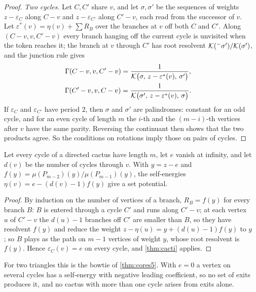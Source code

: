 \begin{proof}
\emph{Two cycles.} Let $C,C'$ share $v$, and let $\sigma,\sigma'$ be the sequences of weights $z-\varepsilon_C$ along $C-v$ and $z-\varepsilon_{C'}$ along $C'-v$, each read from the successor of $v$. Let $\varepsilon^{*}(v)=\eta(v)+\sum R_B$ over the branches at $v$ off both $C$ and $C'$. Along $(C-v,v,C'-v)$ every branch hanging off the current cycle is unvisited when the token reaches it; the branch at $v$ through $C'$ has root resolvent $\mathcal{K}({}^{-}\sigma')/\mathcal{K}(\sigma')$, and the junction rule gives
\begin{gather*}
\Gamma(C-v,v,C'-v)=\frac{1}{\mathcal{K}\bigl(\sigma,\,z-\varepsilon^{*}(v),\,\sigma'\bigr)},\\
\Gamma(C'-v,v,C-v)=\frac{1}{\mathcal{K}\bigl(\sigma',\,z-\varepsilon^{*}(v),\,\sigma\bigr)}.
\end{gather*}
If $\varepsilon_C$ and $\varepsilon_{C'}$ have period $2$, then $\sigma$ and $\sigma'$ are palindromes: constant for an odd cycle, and for an even cycle of length $m$ the $i$-th and the $(m-i)$-th vertices after $v$ have the same parity. Reversing the continuant then shows that the two products agree. So the conditions on rotations imply those on pairs of cycles.
\end{proof}

\begin{corollary}\label{cor:uniform-cacti}
Let every cycle of a directed cactus have length $m$, let $e$ vanish at infinity, and let $d(v)$ be the number of cycles through $v$. With $y=z-e$ and $f(y)=\mu(P_{m-2})(y)/\mu(P_{m-1})(y)$, the self-energies $\eta(v)=e-(d(v)-1)f(y)$ give a set potential.
\end{corollary}
\begin{proof}
By induction on the number of vertices of a branch, $R_B=f(y)$ for every branch $B$: $B$ is entered through a cycle $C'$ and runs along $C'-v$; at each vertex $u$ of $C'-v$ the $d(u)-1$ branches off $C'$ are smaller than $B$, so they have resolvent $f(y)$ and reduce the weight $z-\eta(u)=y+(d(u)-1)f(y)$ to $y$; so $B$ plays as the path on $m-1$ vertices of weight $y$, whose root resolvent is $f(y)$. Hence $\varepsilon_C(v)=e$ on every cycle, and \cref{thm:cacti} applies.
\end{proof}

For two triangles this is the bowtie of \cref{thm:cores5}. With $e=0$ a vertex on several cycles has a self-energy with negative leading coefficient, so no set of exits produces it, and no cactus with more than one cycle arises from exits alone.

